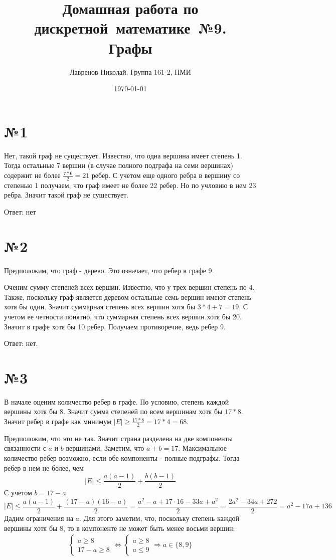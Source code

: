 \documentclass[12pt, tikz]{article}
\title{Домашная работа по дискретной~математике~№9.\\Графы}
\date{\today}
\author{Лавренов Николай. Группа 161-2, ПМИ}
\begin{document}
	\maketitle
	\newpage
	\section*{№1}
	Нет, такой граф не существует. Известно, что одна вершина имеет степень 1.
	Тогда остальные 7 вершин (в случае полного подграфа на семи вершинах)
	содержит не более $\frac{7 * 6}{2}=21$ ребер. С учетом еще одного ребра в вершину со степенью 1 получаем, что граф имеет не более 22 ребер. Но по учловию в нем 23 ребра.
	Значит такой граф не существует.
	
	Ответ: нет
	\section*{№2}
	Предположим, что граф - дерево. Это означает, что ребер в графе 9.
	
	Оченим сумму степеней всех вершин. Известно, что у трех вершин степень по 4.
	Также, поскольку граф является деревом остальные семь вершин имеют степень хотя бы один. Значит суммарная степень всех вершин хотя бы $3 * 4 + 7 = 19$.
	С учетом ее четности понятно, что суммарная степень всех вершин хотя бы 20.
	Значит в графе хотя бы 10 ребер. Получаем противоречие, ведь ребер 9.
	
	Ответ: нет.
	
	\section*{№3}

	В начале оценим количество ребер в графе. По условию, степень каждой вершины хотя бы 8.
	Значит сумма степеней по всем вершинам хотя бы $17 * 8$. Значит ребер в графе как минимум 
	$|E| \geqslant \frac{17 * 8}{2}=17*4=68$.
	
	Предположим, что это не так. Значит страна разделена на две компоненты связанности с $a$ и $b$ вершинами.
	Заметим, что $a + b = 17$. Максимальное количество ребер возможно, 
	если обе компоненты - полные подграфы. Тогда ребер в нем не более, чем
	$$|E|\leqslant\frac{a(a - 1)}{2} + \frac{b(b - 1)}{2}$$
	С учетом $b = 17 - a$
	$$|E|\leqslant\frac{a(a - 1)}{2} + \frac{(17 - a)(16 - a)}{2}=
	\frac{a^2 - a + 17 \cdot 16 - 33a + a^2}{2}=
	\frac{2a^2 - 34a + 272}{2}=
	a^2-17a+136$$
	Дадим ограничения на $a$. Для этого заметим, что, поскольку степень каждой вершины хотя бы 8, то в компоненте не может быть менее восьми вершин:
	\begin{eqnarray}
	\left\{\begin{aligned}
	a \geqslant 8 \\
	17 - a \geqslant 8
	\end{aligned}
	\right.
	\Leftrightarrow
	\left\{\begin{aligned}
	a \geqslant 8 \\
	a \leqslant 9
	\end{aligned}
	\right.
	\Rightarrow
	a \in \{8, 9\}
	\end{eqnarray}
	
\end{document}
